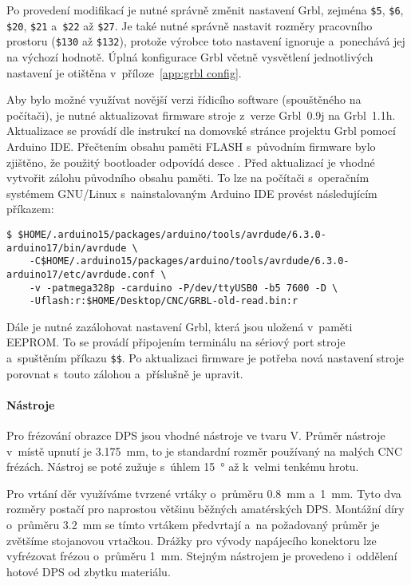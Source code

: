 Po provedení modifikací je nutné správně změnit nastavení Grbl, zejména
\verb|$5|, \verb|$6|, \verb|$20|, \verb|$21| a~\verb|$22| až \verb|$27|.
Je také nutné správně nastavit rozměry pracovního prostoru (\verb|$130| až
\verb|$132|), protože výrobce toto nastavení ignoruje a~ponechává jej na
výchozí hodnotě. Úplná konfigurace Grbl včetně vysvětlení jednotlivých
nastavení je otištěna v~příloze~\vref{app:grbl config}.

Aby bylo možné využívat novější verzi řídicího software (spouštěného na
počítači), je nutné aktualizovat firmware stroje z~verze Grbl~0.9j na
Grbl~1.1h. Aktualizace se provádí dle instrukcí na domovské stránce projektu
Grbl pomocí Arduino IDE. Přečtením obsahu paměti FLASH s~původním firmware bylo
zjištěno, že použitý bootloader odpovídá desce . Před aktualizací je vhodné vytvořit zálohu původního obsahu
paměti. To lze na počítači s~operačním systémem GNU/Linux s~nainstalovaným
Arduino IDE provést následujícím příkazem:
\begin{lstlisting}[style=terminal]
$ $HOME/.arduino15/packages/arduino/tools/avrdude/6.3.0-arduino17/bin/avrdude \
    -C$HOME/.arduino15/packages/arduino/tools/avrdude/6.3.0-arduino17/etc/avrdude.conf \
    -v -patmega328p -carduino -P/dev/ttyUSB0 -b5 7600 -D \
    -Uflash:r:$HOME/Desktop/CNC/GRBL-old-read.bin:r
\end{lstlisting}
Dále je nutné zazálohovat nastavení Grbl, která jsou uložená v~paměti EEPROM.
To se provádí připojením terminálu na sériový port stroje a~spuštěním příkazu
\verb|$$|.
Po aktualizaci firmware je potřeba nová nastavení stroje porovnat s~touto
zálohou a~příslušně je upravit.

\paragraph{Nástroje}
Pro frézování obrazce DPS jsou vhodné nástroje ve tvaru V. Průměr nástroje
v~místě upnutí je \SI{3,175}{\milli\meter}, to je standardní rozměr používaný
na malých CNC frézách. Nástroj se poté zužuje s~úhlem
\SI{15}{\degree} až k~velmi tenkému hrotu.

Pro vrtání děr využíváme tvrzené vrtáky o~průměru \SI{0,8}{\milli\meter}
a~\SI{1}{\milli\meter}. Tyto dva rozměry postačí pro naprostou většinu běžných
amatérských DPS. Montážní díry o~průměru \SI{3,2}{\milli\meter} se tímto
vrtákem předvrtají a~na požadovaný průměr je zvětšíme stojanovou vrtačkou.
Drážky pro vývody napájecího konektoru lze vyfrézovat frézou \uv{corn bit}
o~průměru \SI{1}{\milli\meter}. Stejným nástrojem je provedeno i~oddělení
hotové DPS od zbytku materiálu.

